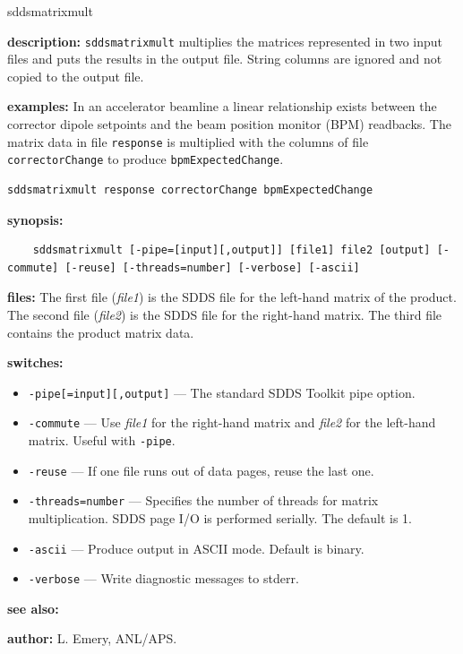 \begin{sddsprog}{sddsmatrixmult}
  \item \textbf{description:} \verb|sddsmatrixmult| multiplies the matrices represented in two input files and puts the results in the output file. String columns are ignored and not copied to the output file.
  \item \textbf{examples:} In an accelerator beamline a linear relationship exists between the corrector dipole setpoints and the beam position monitor (BPM) readbacks. The matrix data in file \verb|response| is multiplied with the columns of file \verb|correctorChange| to produce \verb|bpmExpectedChange|.
    \begin{verbatim}
sddsmatrixmult response correctorChange bpmExpectedChange
    \end{verbatim}
  \item \textbf{synopsis:}
    \begin{verbatim}
    sddsmatrixmult [-pipe=[input][,output]] [file1] file2 [output] [-commute] [-reuse] [-threads=number] [-verbose] [-ascii]
    \end{verbatim}
  \item \textbf{files:} The first file (\emph{file1}) is the SDDS file for the left-hand matrix of the product. The second file (\emph{file2}) is the SDDS file for the right-hand matrix. The third file contains the product matrix data.
  \item \textbf{switches:}
    \begin{itemize}
      \item \verb|-pipe[=input][,output]| --- The standard SDDS Toolkit pipe option.
      \item \verb|-commute| --- Use \emph{file1} for the right-hand matrix and \emph{file2} for the left-hand matrix. Useful with \verb|-pipe|.
      \item \verb|-reuse| --- If one file runs out of data pages, reuse the last one.
      \item \verb|-threads=number| --- Specifies the number of threads for matrix multiplication. SDDS page I/O is performed serially. The default is 1.
      \item \verb|-ascii| --- Produce output in ASCII mode. Default is binary.
      \item \verb|-verbose| --- Write diagnostic messages to stderr.
    \end{itemize}
  \item \textbf{see also:} 
  \item \textbf{author:} L. Emery, ANL/APS.
\end{sddsprog}
